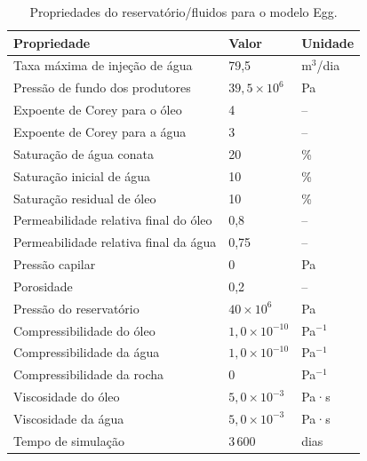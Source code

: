 
\begin{table}[H]
\centering
\caption{Propriedades do reservatório/fluidos para o modelo Egg.}
\label{tab:2.2}
\begin{tabular}{lll}
\hline
\textbf{Propriedade} & \textbf{Valor} & \textbf{Unidade} \\ \hline
Taxa máxima de injeção de água & 79,5 & m$^{3}$/dia \\
Pressão de fundo dos produtores & $39{,}5 \times 10^{6}$ & Pa \\
Expoente de Corey para o óleo & 4 & – \\
Expoente de Corey para a água & 3 & – \\
Saturação de água conata & 20 & \% \\
Saturação inicial de água & 10 & \% \\
Saturação residual de óleo & 10 & \% \\
Permeabilidade relativa final do óleo & 0,8 & – \\
Permeabilidade relativa final da água & 0,75 & – \\
Pressão capilar & 0 & Pa \\
Porosidade & 0,2 & – \\
Pressão do reservatório & $40 \times 10^{6}$ & Pa \\
Compressibilidade do óleo & $1{,}0 \times 10^{-10}$ & Pa$^{-1}$ \\
Compressibilidade da água & $1{,}0 \times 10^{-10}$ & Pa$^{-1}$ \\
Compressibilidade da rocha & 0 & Pa$^{-1}$ \\
Viscosidade do óleo & $5{,}0 \times 10^{-3}$ & Pa·s \\
Viscosidade da água & $5{,}0 \times 10^{-3}$ & Pa·s \\
Tempo de simulação & 3\,600 & dias \\ \hline
\end{tabular}
\end{table}

